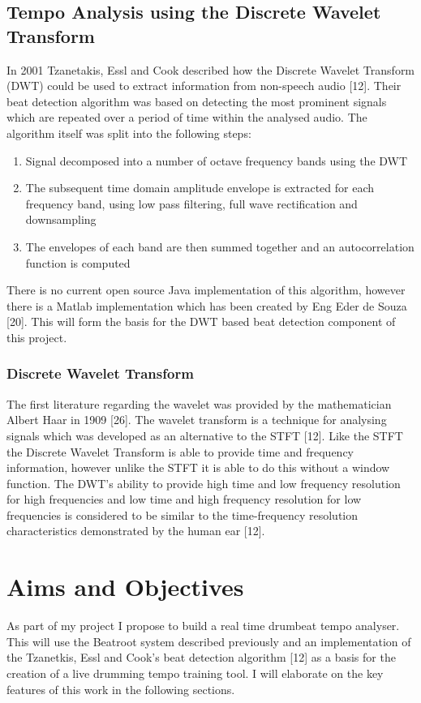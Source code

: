 \documentclass[a4paper, 11pt]{article}
\begin{document}
\subsection{Tempo Analysis using the Discrete Wavelet Transform}
In 2001 Tzanetakis, Essl and Cook described how the Discrete Wavelet Transform (DWT) could be used to extract information from non-speech audio [12]. Their beat detection algorithm was based on detecting the most prominent signals which are repeated over a period of time within the analysed audio. The algorithm itself was split into the following steps: 

\begin{enumerate}
\item Signal decomposed into a number of octave frequency bands using the DWT
\item The subsequent time domain amplitude envelope is extracted for each frequency band, using low pass filtering, full wave rectification and downsampling
\item The envelopes of each band are then summed together and an autocorrelation function is computed
\end{enumerate}

There is no current open source Java implementation of this algorithm, however there is a Matlab implementation which has been created by Eng Eder de Souza [20]. This will form the basis for the DWT based beat detection component of this project.


\subsubsection{Discrete Wavelet Transform}
The first literature regarding the wavelet was provided by the mathematician Albert Haar in 1909 [26]. The wavelet transform is a technique for analysing signals which was developed as an alternative to the STFT [12]. Like the STFT the Discrete Wavelet Transform is able to provide time and frequency information, however unlike the STFT it is able to do this without a window function. The DWT's ability to provide high time and low frequency resolution for high frequencies and low time and high frequency resolution for low frequencies is considered to be similar to the time-frequency resolution characteristics demonstrated by the human ear [12].

\maketitle{}
\section{Aims and Objectives}
As part of my project I propose to build a real time drumbeat tempo analyser. This will use the Beatroot system described previously and an implementation of the Tzanetkis, Essl and Cook's beat detection algorithm [12] as a basis for the creation of a live drumming tempo training tool. I will elaborate on the key features of this work in the following sections.
\end{document}
